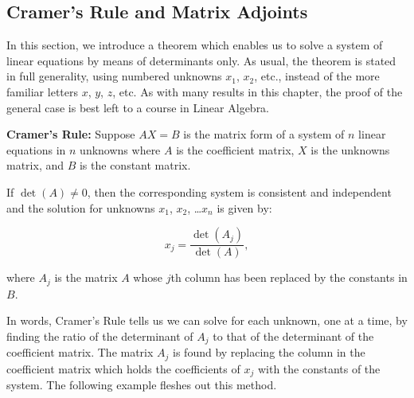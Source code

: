 \documentclass{ximera}
\begin{document}
\newpage

\subsection{Cramer's Rule and Matrix Adjoints}
\label{CramersRuleMatrixAdjoints}

In this section, we introduce a theorem which enables us to solve a system of linear equations by means of determinants only.  As usual, the theorem is stated in full generality, using numbered unknowns $x_{1}$, $x_2$, etc., instead of the more familiar letters $x$, $y$, $z$, etc.   As with many results in this chapter, the proof of the general case is best left to a course in Linear Algebra.

 


\begin{theorem} \label{CramersRule}  \textbf{Cramer's Rule:} Suppose  $AX = B$ is the matrix form of a system of $n$ linear equations in $n$ unknowns where $A$ is the coefficient matrix, $X$ is the unknowns matrix, and $B$ is the constant matrix. 

If $\det(A) \neq 0$, then the corresponding system is consistent and independent and the solution for unknowns $x_{1}$, $x_2$, \ldots $x_{n}$ is given by:

\[ x_{j} = \frac{\det\left(A_{j}\right)}{\det(A)},\]

where $A_{j}$ is the matrix $A$ whose $j$th column has been replaced by the constants in $B$.

\end{theorem}


 

In words, Cramer's Rule tells us we can solve for each unknown, one at a time, by finding the ratio of the determinant of $A_{j}$ to that of the determinant of the coefficient matrix.  The matrix $A_{j}$ is found by replacing the column in the coefficient matrix which holds the coefficients of $x_{j}$ with the constants of the system.  The following example fleshes out this method.

 
\end{document}
